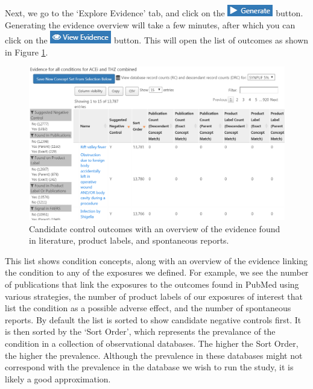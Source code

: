 \documentclass[11pt]{book}
\begin{document}
Next, we go to the `Explore Evidence' tab, and click on the
\includegraphics{images/MethodValidity/generate.png} button. Generating
the evidence overview will take a few minutes, after which you can click
on the \includegraphics{images/MethodValidity/viewEvidence.png} button.
This will open the list of outcomes as shown in Figure
\ref{fig:candidateNcs}.

\begin{figure}

{\centering \includegraphics[width=1\linewidth]{images/MethodValidity/candidateNcs} 

}

\caption{Candidate control outcomes with an overview of the evidence found in literature, product labels, and spontaneous reports.}\label{fig:candidateNcs}
\end{figure}

This list shows condition concepts, along with an overview of the
evidence linking the condition to any of the exposures we defined. For
example, we see the number of publications that link the exposures to
the outcomes found in PubMed using various strategies, the number of
product labels of our exposures of interest that list the condition as a
possible adverse effect, and the number of spontaneous reports. By
default the list is sorted to show candidate negative controls first. It
is then sorted by the `Sort Order', which represents the prevalance of
the condition in a collection of observational databases. The higher the
Sort Order, the higher the prevalence. Although the prevalence in these
databases might not correspond with the prevalence in the database we
wish to run the study, it is likely a good approximation.
\end{document}
